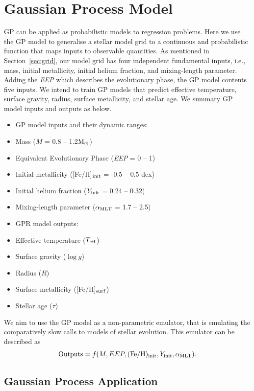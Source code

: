 \section{Gaussian Process Model}\label{sec:gpmodel}

GP can be applied as probabilistic models to regression problems. Here we use the GP model to generalise a stellar model grid to a continuous and probabilistic function that maps inputs to observable quantities. 
%
As mentioned in Section~\ref{sec:grid}, our model grid has four independent fundamental inputs, i.e., mass, initial metallicity, initial helium fraction, and mixing-length parameter. Adding the {\it EEP} which describes the evolutionary phase, the GP model contents five inputs. We intend to train GP models that predict effective temperature, surface gravity, radius, surface metallicity, and stellar age. We summary GP model inputs and outputs as below.
\begin{itemize}
\item GP model inputs and their dynamic ranges:
\item[] Mass ($M$ = 0.8 -- 1.2$\rm M_{\odot}$)
\item[] Equivalent Evolutionary Phase ({\it EEP} = 0 -- 1)
\item[] Initial metallicity ([Fe/H]$_{\rm init}$ =  -0.5 -- 0.5 dex)
\item[] Initial helium fraction ($Y_{\rm init}$ = 0.24 -- 0.32)
\item[] Mixing-length parameter ($\alpha_{\rm MLT}$ = 1.7 -- 2.5)
\item GPR model outputs: 
\item[] Effective temperature ($T_{\rm eff}$) 
\item[] Surface gravity ($\log g$)
\item[] Radius ($R$)
\item[] Surface metallicity ([Fe/H]$_{\rm surf}$)
\item[] Stellar age ($\tau$)
\end{itemize}
We aim to use the GP model as a non-parametric emulator, that is emulating the comparatively slow calls to models of stellar evolution.
This emulator can be described as
\begin{equation}\label{gprmodel}
{\rm Outputs} = f(M, EEP, ({\rm Fe/H})_{\rm init}, Y_{\rm init}, \alpha_{\rm MLT}). 
\end{equation}


\subsection{Gaussian Process Application}

